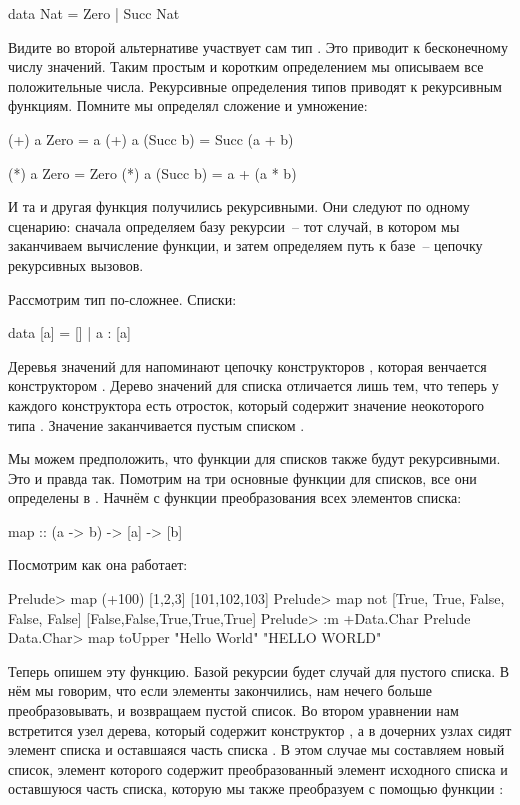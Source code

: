 \begin{code}
data Nat = Zero | Succ Nat
\end{code}

Видите во второй альтернативе участвует сам тип .
Это приводит к бесконечному числу значений. Таким
простым и коротким определением мы описываем все
положительные числа. Рекурсивные определения типов приводят
к рекурсивным функциям. Помните мы определял сложение 
и умножение:

\begin{code}
(+) a Zero     = a
(+) a (Succ b) = Succ (a + b)

(*) a Zero     = Zero
(*) a (Succ b) = a + (a * b)   
\end{code}

И та и другая функция получились рекурсивными.
Они следуют по одному сценарию: сначала определяем базу
рекурсии~-- тот случай, в котором мы заканчиваем 
вычисление функции, и затем определяем путь к базе~--
цепочку рекурсивных вызовов. 

Рассмотрим тип по-сложнее. Списки:

\begin{code}
data [a] = [] | a : [a]
\end{code}

Деревья значений для  напоминают цепочку 
конструкторов , которая венчается конструктором
. Дерево значений для списка отличается лишь тем,
что теперь у каждого конструктора  есть отросток,
который содержит значение неокоторого типа . Значение 
заканчивается пустым списком \In{[]}.

Мы можем предположить, что функции для списков также будут
рекурсивными. Это и правда так. Помотрим на
три основные функции для списков, все они определены в 
. Начнём с функции преобразования всех элементов списка:

\begin{code}
map :: (a -> b) -> [a] -> [b]
\end{code}

Посмотрим как она работает:

\begin{code}
Prelude> map (+100) [1,2,3]
[101,102,103]
Prelude> map not [True, True, False, False, False]
[False,False,True,True,True]
Prelude> :m +Data.Char
Prelude Data.Char> map toUpper "Hello World"
"HELLO WORLD"
\end{code}

Теперь опишем эту функцию.
Базой рекурсии будет случай для пустого списка.
В нём мы говорим, что если элементы закончились, нам нечего
больше преобразовывать, и возвращаем пустой список. 
Во втором уравнении нам встретится узел дерева,
который содержит конструктор \In{:}, а в дочерних узлах
сидят элемент списка  и оставшаяся часть списка . 
 В этом случае 
мы составляем новый список, элемент которого содержит
преобразованный элемент  исходного списка
и оставшуюся часть списка, которую мы также
преобразуем с помощью функции :

